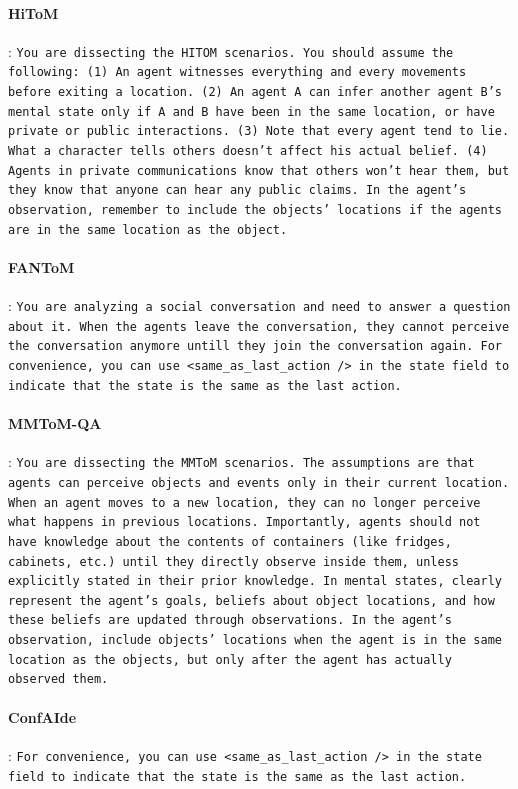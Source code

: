 \paragraph{HiToM}: \texttt{You are dissecting the HITOM scenarios. You should assume the following: (1) An agent witnesses everything and every movements before exiting a location. (2) An agent A can infer another agent B's mental state only if A and B have been in the same location, or have private or public interactions. (3) Note that every agent tend to lie. What a character tells others doesn't affect his actual belief. (4) Agents in private communications know that others won't hear them, but they know that anyone can hear any public claims. In the agent's observation, remember to include the objects' locations if the agents are in the same location as the object.}

\paragraph{FANToM}: \texttt{You are analyzing a social conversation and need to answer a question about it. When the agents leave the conversation, they cannot perceive the conversation anymore untill they join the conversation again. For convenience, you can use <same\_as\_last\_action /> in the state field to indicate that the state is the same as the last action.}

\paragraph{MMToM-QA}: \texttt{You are dissecting the MMToM scenarios. The assumptions are that agents can perceive objects and events only in their current location. When an agent moves to a new location, they can no longer perceive what happens in previous locations. Importantly, agents should not have knowledge about the contents of containers (like fridges, cabinets, etc.) until they directly observe inside them, unless explicitly stated in their prior knowledge. In mental states, clearly represent the agent's goals, beliefs about object locations, and how these beliefs are updated through observations. In the agent's observation, include objects' locations when the agent is in the same location as the objects, but only after the agent has actually observed them.}

\paragraph{ConfAIde}: \texttt{For convenience, you can use <same\_as\_last\_action /> in the state field to indicate that the state is the same as the last action.}

